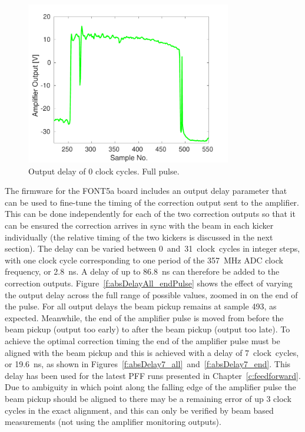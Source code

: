 \begin{figure}
  \centering
  \includegraphics[width=0.8\textwidth]{Figures/commissioning/absDelay0_all}
  \caption{Output delay of 0 clock cycles. Full pulse.}
  \label{f:absDelay0_all}
\end{figure}

The firmware for the FONT5a board includes an output delay parameter that can be used to fine-tune the timing of the correction output sent to the amplifier. This can be done independently for each of the two correction outputs so that it can be ensured the correction arrives in sync with the beam in each kicker individually (the relative timing of the two kickers is discussed in the next section). The delay can be varied between 0~and~31~clock~cycles in integer steps, with one clock cycle corresponding to one period of the 357~MHz ADC clock frequency, or 2.8~ns. A delay of up to 86.8~ns can therefore be added to the correction outputs. Figure~\ref{f:absDelayAll_endPulse} shows the effect of varying the output delay across the full range of possible values, zoomed in on the end of the pulse. For all output delays the beam pickup remains at sample 493, as expected. Meanwhile, the end of the amplifier pulse is moved from before the beam pickup (output too early) to after the beam pickup (output too late). To achieve the optimal correction timing the end of the amplifier pulse must be aligned with the beam pickup and this is achieved with a delay of 7~clock~cycles, or 19.6~ns, as shown in Figures~\ref{f:absDelay7_all}~and~\ref{f:absDelay7_end}. This delay has been used for the latest PFF runs presented in Chapter~\ref{c:feedforward}. Due to ambiguity in which point along the falling edge of the amplifier pulse the beam pickup should be aligned to there may be a remaining error of up 3 clock cycles in the exact alignment, and this can only be verified by beam based measurements (not using the amplifier monitoring outputs). 


